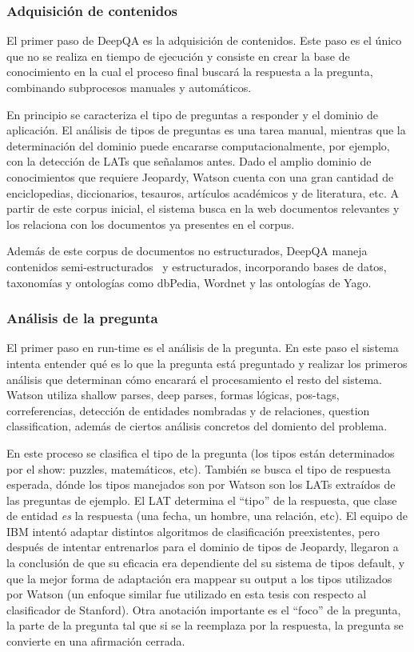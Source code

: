 \subsubsection*{Adquisición de contenidos}

El primer paso de DeepQA es la adquisición de contenidos. Este paso es
el único que no se realiza en tiempo de ejecución y consiste en
crear la base de conocimiento en la cual el proceso final buscará la
respuesta a la pregunta, combinando subprocesos manuales y
automáticos. 

En principio se caracteriza el tipo de preguntas a responder y el
dominio de aplicación. El análisis de tipos de preguntas es una
tarea manual, mientras que la determinación del dominio puede
encararse computacionalmente, por ejemplo, con la detección de LATs
que señalamos antes. Dado el amplio dominio de conocimientos que
requiere Jeopardy, Watson cuenta con una gran cantidad de
enciclopedias, diccionarios, tesauros, artículos académicos y de
literatura, etc. A partir de este corpus inicial, el sistema busca en
la web documentos relevantes y los relaciona con los documentos ya
presentes en el corpus. 

Además de este corpus de documentos no estructurados, DeepQA maneja
contenidos semi-estructurados \ y estructurados, incorporando bases de
datos, taxonomías y ontologías como dbPedia, Wordnet y las
ontologías de Yago. 

\subsubsection*{Análisis de la pregunta}

El primer paso en run-time es el análisis de la pregunta. En este paso
el sistema intenta entender qué es lo que la pregunta está
preguntado y realizar los primeros análisis que determinan cómo
encarará el procesamiento el resto del sistema. Watson utiliza
shallow parses, deep parses, formas lógicas, pos-tags,
correferencias, detección de entidades nombradas y de relaciones,
question classification, además de ciertos análisis concretos del
domiento del problema.

En este proceso se clasifica el tipo de la pregunta (los tipos están
determinados por el show: puzzles, matemáticos, etc). También se
busca el tipo de respuesta esperada, dónde los tipos manejados son
por Watson son los LATs extraídos de las preguntas de ejemplo. El LAT
determina el {\textquotedblleft}tipo{\textquotedblright} de la
respuesta, que clase de entidad \textit{es} la respuesta (una fecha, un
hombre, una relación, etc). El equipo de IBM intentó adaptar
distintos algoritmos de clasificación preexistentes, pero después
de intentar entrenarlos para el dominio de tipos de Jeopardy, llegaron
a la conclusión de que su eficacia era dependiente del su sistema de
tipos default, y que la mejor forma de adaptación era mappear su
output a los tipos utilizados por Watson (un enfoque similar fue
utilizado en esta tesis con respecto al clasificador de Stanford). Otra
anotación importante es el
{\textquotedblleft}foco{\textquotedblright} de la pregunta, la parte de
la pregunta tal que si se la reemplaza por la respuesta, la pregunta se
convierte en una afirmación cerrada.

